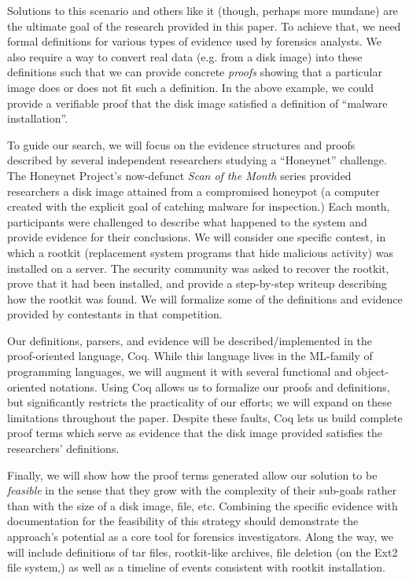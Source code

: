 \documentclass[nocopyrightspace]{sigplanconf}
\begin{document}
Solutions to this scenario and others like it (though, perhaps more mundane)
are the ultimate goal of the research provided in this paper. To achieve that,
we need formal definitions for various types of evidence used by forensics
analysts.  We also require a way to convert real data (e.g. from a disk image)
into these definitions such that we can provide concrete {\em proofs} showing
that a particular image does or does not fit such a definition. In the above
example, we could provide a verifiable proof that the disk image satisfied a
definition of ``malware installation''. 

To guide our search, we will focus on the evidence structures and proofs
described by several independent researchers studying a ``Honeynet''
challenge. The Honeynet Project\cite{honeynet}'s now-defunct {\it Scan of the
Month} series provided researchers a disk image attained from a compromised
honeypot (a computer created with the explicit goal of catching malware for
inspection.) Each month, participants were challenged to describe what
happened to the system and provide evidence for their conclusions. We will
consider one specific contest\cite{honeynet-15}, in which a rootkit
(replacement system programs that hide malicious activity) was installed on a
server. The security community was asked to recover the rootkit, prove that it
had been installed, and provide a step-by-step writeup describing how the
rootkit was found. We will formalize some of the definitions and evidence
provided by contestants in that competition.

Our definitions, parsers, and evidence will be described/implemented in the
proof-oriented language, Coq. While this language lives in the ML-family of
programming languages, we will augment it with several functional and
object-oriented notations. Using Coq allows us to formalize our proofs and
definitions, but significantly restricts the practicality of our efforts; we
will expand on these limitations throughout the paper. Despite these faults,
Coq lets us build complete proof terms which serve as evidence that the disk
image provided satisfies the researchers' definitions.

Finally, we will show how the proof terms generated allow our solution to be
{\em feasible} in the sense that they grow with the complexity of their
sub-goals rather than with the size of a disk image, file, etc. Combining the
specific evidence with documentation for the feasibility of this strategy
should demonstrate the approach's potential as a core tool for forensics
investigators. Along the way, we will include definitions of tar files,
rootkit-like archives, file deletion (on the Ext2 file system,) as well as a
timeline of events consistent with rootkit installation.
\end{document}
